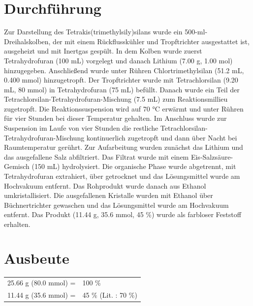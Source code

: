 \documentclass[12pt]{article}
\begin{document}
\begin{onehalfspace}
 \section{Durchführung \cite{silicongilman}}
Zur Darstellung des Tetrakis(trimethylsily)silans wurde ein 500-ml-Dreihalskolben, der mit einem Rückflusskühler und Tropftrichter ausgestattet ist, ausgeheizt und mit Inertgas gespült. In dem Kolben wurde zuerst
 Tetrahydrofuran (100 \si{\milli\liter}) vorgelegt und danach Lithium (7.00 \si{\gram}, 1.00 \si{\mol}) hinzugegeben. Anschließend wurde unter Rühren  
 Chlortrimethylsilan (51.2 \si{\milli\liter}, 0.400 \si{\milli\mol}) hinzugetropft. Der Tropftrichter wurde mit Tetrachlorsilan (9.20 \si{\milli\liter}, 80 \si{\milli\mol}) in Tetrahydrofuran (75 \si{\milli\liter}) befüllt. Danach wurde ein Teil der Tetrachlorsilan-Tetrahydrofuran-Mischung (7.5 \si{\milli\liter}) zum Reaktionsmillieu zugetropft. Die Reaktionssuspension wird auf 70 \si{\celsius} erwärmt und unter Rühren für vier Stunden bei dieser Temperatur gehalten. Im Anschluss wurde zur Suspension im Laufe von vier Stunden die restliche Tetrachlorsilan-Tetrahydrofuran-Mischung kontinuerlich zugetropft und dann über Nacht bei Raumtemperatur gerührt. Zur Aufarbeitung wurden zunächst das Lithium und das ausgefallene Salz abfiltriert. Das Filtrat wurde mit einem Eis-Salzsäure-Gemisch (150 \si{\milli\liter}) hydrolysiert. Die organische Phase wurde abgetrennt, mit Tetrahydrofuran extrahiert, über  getrocknet und das Lösungsmittel wurde am Hochvakuum entfernt. Das Rohprodukt wurde danach aus Ethanol umkristallisiert. Die ausgefallenen Kristalle wurden mit Ethanol über Büchnertrichter gewaschen und das Lösungsmittel wurde am Hochvakuum entfernt. Das Produkt (11.44 g, 35.6 mmol, 45 \%) wurde als farbloser Feststoff erhalten.

\section{Ausbeute}
\begin{tabular}{ rl}
  25.66 g (80.0 mmol) =  & 100 \%\\
  11.44 g (35.6 mmol) =  & 45 \% (Lit.\cite{silicongilman} : 70 \%) \\
 \end{tabular}
\newpage

\end{onehalfspace}
\end{document}
